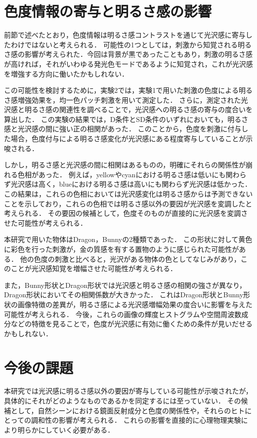     \section{色度情報の寄与と明るさ感の影響}
        前節で述べたとおり，色度情報は明るさ感コントラストを通じて光沢感に寄与したわけではないと考えられる．
        可能性の1つとしては，刺激から知覚される明るさ感の影響が考えられた．今回は背景が黒であったこともあり，刺激の明るさ感が高ければ，それがいわゆる発光色モード\cite{LightMode}であるように知覚され，これが光沢感を増強する方向に働いたかもしれない．
        
        この可能性を検討するために，実験2では，実験1で用いた刺激の色度による明るさ感増強効果を，均一色パッチ刺激を用いて測定した．
        さらに，測定された光沢感と明るさ感の関連性を調べることで，光沢感への明るさ感の寄与の度合いを算出した．
        この実験の結果では，D条件とSD条件のいずれにおいても，明るさ感と光沢感の間に強い正の相関があった．
        このことから，色度を刺激に付与した場合，色度付与による明るさ感変化が光沢感にある程度寄与していることが示唆される．

        しかし，明るさ感と光沢感の間に相関はあるものの，明確にそれらの関係性が崩れる色相があった．
        例えば，yellowやcyanにおける明るさ感は低いにも関わらず光沢感は高く，blueにおける明るさ感は高いにも関わらず光沢感は低かった．
        この結果は，これらの色相においては光沢感変化は明るさ感からは予測できないことを示しており，これらの色相では明るさ感以外の要因が光沢感を変調したと考えられる．
        その要因の候補として，色度そのものが直接的に光沢感を変調させた可能性が考えられる．
        
        本研究で用いた物体はDragon，Bunnyの2種類であった．
        この形状に対して黄色に彩色を行った刺激が，金の質感を有する置物のように感じられた可能性がある．
        他の色度の刺激と比べると，光沢がある物体の色としてなじみがあり，このことが光沢感知覚を増幅させた可能性が考えられる．
        
        また，Bunny形状とDragon形状では光沢感と明るさ感の相関の強さが異なり，Dragon形状においてその相関係数が大きかった．
        これはDragon形状とBunny形状の画像特徴の差異が，明るさ感による光沢感増幅効果の度合いに影響を与えた可能性が考えられる．
        今後，これらの画像の輝度ヒストグラムや空間周波数成分などの特徴を見ることで，色度が光沢感に有効に働くための条件が見いだせるかもしれない．

    \section{今後の課題}
        本研究では光沢感に明るさ感以外の要因が寄与している可能性が示唆されたが，具体的にそれがどのようなものであるかを同定するには至っていない．
        その候補として，自然シーンにおける鏡面反射成分と色度の関係性や，それらのヒトにとっての調和性の影響が考えられる．
        これらの影響を直接的に心理物理実験により明らかにしていく必要がある．

